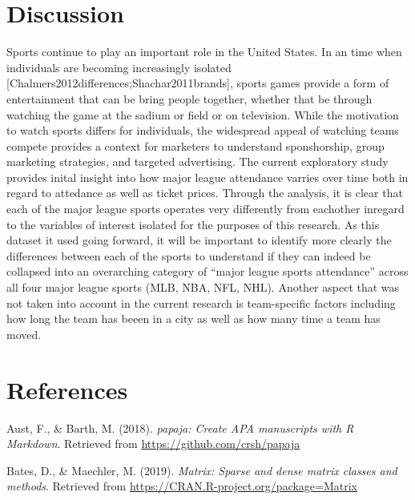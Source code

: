 \documentclass[man, fleqn, noextraspace,floatsintext]{apa6}
\begin{document}
\hypertarget{discussion}{%
\section{Discussion}\label{discussion}}

Sports continue to play an important role in the United States. In an time when individuals are becoming increasingly isolated {[}Chalmers2012differences;Shachar2011brands{]}, sports games provide a form of entertainment that can be bring people together, whether that be through watching the game at the sadium or field or on television. While the motivation to watch sports differs for individuals, the widespread appeal of watching teams compete provides a context for marketers to understand sponshorship, group marketing strategies, and targeted advertising.
The current exploratory study provides inital insight into how major league attendance varries over time both in regard to attedance as well as ticket prices. Through the analysis, it is clear that each of the major league sports operates very differently from eachother inregard to the variables of interest isolated for the purposes of this research.
As this dataset it used going forward, it will be important to identify more clearly the differences between each of the sports to understand if they can indeed be collapsed into an overarching category of \enquote{major league sports attendance} across all four major league sports (MLB, NBA, NFL, NHL). Another aspect that was not taken into account in the current research is team-specific factors including how long the team has beeen in a city as well as how many time a team has moved.

\newpage

\hypertarget{references}{%
\section{References}\label{references}}

\begingroup
\setlength{\parindent}{-0.5in}
\setlength{\leftskip}{0.5in}

\hypertarget{refs}{}
\leavevmode\hypertarget{ref-R-papaja}{}%
Aust, F., \& Barth, M. (2018). \emph{papaja: Create APA manuscripts with R Markdown}. Retrieved from \url{https://github.com/crsh/papaja}

\leavevmode\hypertarget{ref-R-Matrix}{}%
Bates, D., \& Maechler, M. (2019). \emph{Matrix: Sparse and dense matrix classes and methods}. Retrieved from \url{https://CRAN.R-project.org/package=Matrix}
\end{document}
